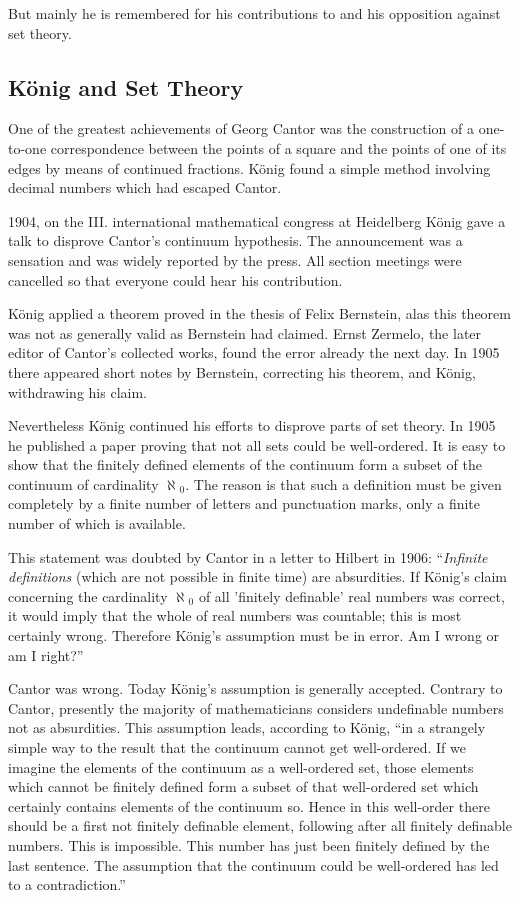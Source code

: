 \documentclass[12pt]{article}
\begin{document}
But mainly he is remembered for his contributions to and his
opposition against set theory.

\subsection{K\"onig and Set Theory}

One of the greatest achievements of Georg Cantor was the construction
of a one-to-one correspondence between the points of a square and the
points of one of its edges by means of continued fractions. K\"onig
found a simple method involving decimal numbers which had escaped
Cantor.

1904, on the III. international mathematical congress at Heidelberg
K\"onig gave a talk to disprove Cantor's continuum hypothesis. The
announcement was a sensation and was widely reported by the press. All
section meetings were cancelled so that everyone could hear his
contribution.

K\"onig applied a theorem proved in the thesis of Felix Bernstein,
alas this theorem was not as generally valid as Bernstein had
claimed. Ernst Zermelo, the later editor of Cantor's collected works,
found the error already the next day. In 1905 there appeared short
notes by Bernstein, correcting his theorem, and K\"onig, withdrawing
his claim.

Nevertheless K\"onig continued his efforts to disprove parts of set
theory. In 1905 he published a paper proving that not all sets could
be well-ordered. It is easy to show that the finitely defined elements
of the continuum form a subset of the continuum of cardinality
$\aleph$$_0$. The reason is that such a definition must be given
completely by a finite number of letters and punctuation marks, only a
finite number of which is available.

This statement was doubted by Cantor in a letter to Hilbert in 1906: ``\emph{Infinite definitions} (which are not possible in finite time) are absurdities. If K\"onig's claim concerning the cardinality $\aleph$$_0$ of all 'finitely definable' real numbers was correct, it would imply that the whole  of real numbers was countable; this is most certainly wrong. Therefore K\"onig's assumption must be in error. Am I wrong or am I right?''

Cantor was wrong. Today K\"onig's assumption is generally
accepted. Contrary to Cantor, presently the majority of mathematicians
considers undefinable numbers not as absurdities. This assumption
leads, according to K\"onig, ``in a strangely simple way to the result
that the continuum cannot get well-ordered. If we imagine the elements
of the continuum as a well-ordered set, those elements which cannot be
finitely defined form a subset of that well-ordered set which
certainly contains elements of the continuum so.  Hence in this
well-order there should be a first not finitely definable element,
following after all finitely definable numbers. This is
impossible. This number has just been finitely defined by the last
sentence. The assumption that the continuum could be well-ordered has
led to a contradiction.''
\end{document}
